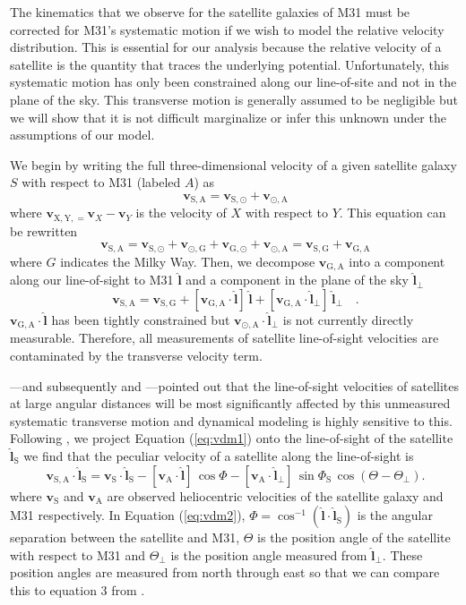\documentclass[preprint,12pt]{aastex}
\newcommand{\eqlabel}[1]{\label{eq:#1}}
\newcommand{\eq}[1]{Equation (\ref{eq:#1})}
\newcommand{\bvec}[1]{\ensuremath{\boldsymbol{#1}}}
\renewcommand{\vector}[1]{\ensuremath{\bvec{#1}}}
\newcommand{\vel}[1]{\ensuremath{\vector{v}_\mathrm{#1}}}
\newcommand{\vrel}[2]{\ensuremath{\vector{v}_{\mathrm{#1},\mathrm{#2}}}}
\newcommand{\los}{\ensuremath{\hat{\vector{l}}}}
\newcommand{\losperp}{\ensuremath{\hat{\vector{l}}_\perp}}
\newcommand{\lossat}{\ensuremath{\hat{\vector{l}}_\mathrm{S}}}
\newcommand{\angsep}{\ensuremath{\Phi}}
\newcommand{\posang}{\ensuremath{\Theta}}
\newcommand{\posangperp}{\ensuremath{\Theta_\perp}}
\begin{document}
The kinematics that we observe for the satellite galaxies of M31 must be
corrected for M31's systematic motion if we wish to model the relative
velocity distribution. This is essential for our analysis because the
relative velocity of a satellite is the quantity that traces the underlying
potential. Unfortunately, this systematic motion has only been constrained
along our line-of-site and not in the plane of the sky. This transverse
motion is generally assumed to be negligible but we will show that it is
not difficult marginalize or infer this unknown under the assumptions of
our model.

We begin by writing the full three-dimensional velocity of a given satellite
galaxy $S$ with respect to M31 (labeled $A$) as
\begin{equation}
    \eqlabel{vdm1}
    \vrel{S}{A} = \vrel{S}{\odot} + \vrel{\odot}{A}
\end{equation}
where $\vrel{X,Y} = \vector{v}_{X}-\vector{v}_Y$ is the velocity of $X$
with respect to $Y$.  This equation can be rewritten
\begin{equation}
    \vrel{S}{A} = \vrel{S}{\odot}+\vrel{\odot}{G}+\vrel{G}{\odot}
                        +\vrel{\odot}{A}
               = \vrel{S}{G} + \vrel{G}{A}
\end{equation}
where $G$ indicates the Milky Way.  Then, we decompose $\vrel{G}{A}$
into a component along our line-of-sight to M31 $\los$ and a
component in the plane of the sky $\losperp$
\begin{equation}
    \vrel{S}{A} = \vrel{S}{G} + [\vrel{G}{A}\cdot\los] \, \los
        + [\vrel{G}{A}\cdot\losperp] \, \losperp \quad .
\end{equation}
$\vrel{G}{A}\cdot\los$ has been tightly
constrained \citep{Courteau:1999} but
$\vrel{\odot}{A}\cdot\losperp$ is not currently directly
measurable. Therefore, all measurements of satellite line-of-sight
velocities are contaminated by the transverse velocity term.

\citet{Bahcall:1981}---and subsequently \citet{ew} and \citet{vdm}---pointed
out that the line-of-sight velocities of satellites at large angular
distances will be most significantly affected by this unmeasured systematic
transverse motion and dynamical modeling is highly sensitive to this.
Following \citet{vdm}, we project \eq{vdm1}
onto the line-of-sight of the satellite $\lossat$ we find that the
peculiar velocity of a satellite along the line-of-sight is
\begin{equation}
    \eqlabel{vdm2}
    \vrel{S}{A}\cdot\lossat = \vel{S}\cdot\lossat
                - [ \vel{A}\cdot\los] \, \cos \angsep
                - [ \vel{A}\cdot\losperp] \,
        \sin \Phi_\mathrm{S} \, \cos \left ( \posang
            - \posangperp \right ).
\end{equation}
where $\vel{S}$ and $\vel{A}$ are observed heliocentric velocities of
the satellite galaxy and M31 respectively. In \eq{vdm2},
$\angsep = \cos^{-1} ( \los\cdot\lossat )$ is the angular separation
between the satellite and M31,
$\posang$ is the position angle of the satellite with respect to M31
and $\posangperp$ is the position angle measured from $\losperp$.
These position angles are measured from north through east so that we
can compare this to equation 3 from
\citet{vdm}.
\end{document}
